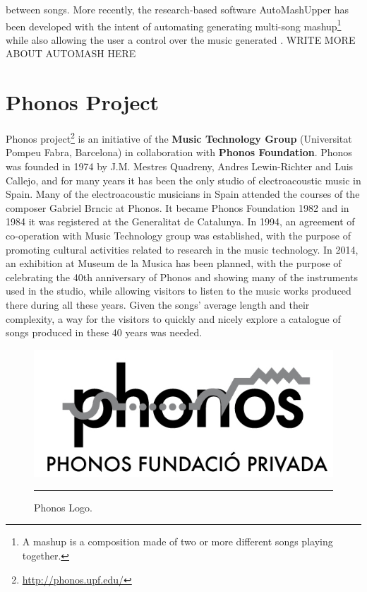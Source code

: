 between songs. More recently, the research-based software AutoMashUpper has been developed with the intent of automating generating multi-song mashup\footnote{A mashup is a composition made of two or more different songs playing together.} while also allowing the user a control over the music generated \cite{automash14}. WRITE MORE ABOUT AUTOMASH HERE


\section{Phonos Project}
Phonos project\footnote{\url{http://phonos.upf.edu/}} is an initiative of the \textbf{Music Technology Group} (Universitat Pompeu Fabra, Barcelona) in collaboration with \textbf{Phonos Foundation}. Phonos was founded in 1974 by J.M. Mestres Quadreny, Andres Lewin-Richter and Luis Callejo, and for many years it has been the only studio of electroacoustic music in Spain. Many of the electroacoustic musicians in Spain attended the courses of the composer Gabriel Brncic at Phonos. It became Phonos Foundation 1982 and in 1984 it was registered at the Generalitat de Catalunya. In 1994, an agreement of co-operation with Music Technology group was established, with the purpose of promoting cultural activities related to research in the music technology. 
In 2014, an exhibition at Museum de la Musica has been planned, with the purpose of celebrating the 40th anniversary of Phonos and showing many of the instruments used in the studio, while allowing visitors to listen to the music works produced there during all these years. Given the songs' average length and their complexity, a way for the visitors to quickly and nicely explore a catalogue of songs produced in these 40 years was needed.

\begin{figure}[htbp]
  \centering
    \includegraphics{Figures/phonos.png}
    \rule{35em}{0.5pt}
  \caption[Phonos]{Phonos Logo.}
  \label{fig:Phonos}
\end{figure}

